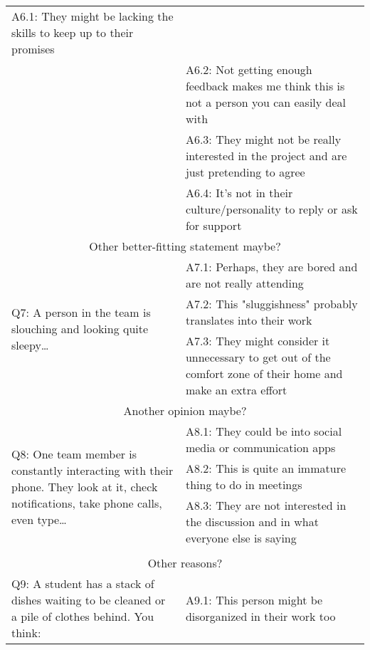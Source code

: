 \begin{longtable}{|  p{}  |  p{} |}
   	\hspace{0.3cm} A6.1: They might be lacking the skills to keep up to their promises \\
   	& \hspace{0.3cm} A6.2: Not getting enough feedback makes me think this is not a person you can easily deal with \\
   	& \hspace{0.3cm} A6.3: They might not be really interested in the project and are just pretending to agree \\
   & \hspace{0.3cm} A6.4: It’s not in their culture/personality to reply or ask for support \\
\hline
\multicolumn{2}{|c|}{Other better-fitting statement maybe?} \\
\hline
\multirow{3}{6cm}{Q7: A person in the team is slouching and looking quite sleepy…}
 & 
    \hspace{0.3cm} A7.1: Perhaps, they are bored and are not really attending \\
   &  \hspace{0.3cm} A7.2: This "sluggishness" probably translates into their work \\
    & \hspace{0.3cm} A7.3: They might consider it unnecessary to get out of the comfort zone of their home and make an extra effort \\
\hline
\multicolumn{2}{|c|}{Another opinion maybe?} \\
\hline
\multirow{4}{6cm}{Q8: One team member is constantly interacting with their phone. They look at it, check notifications, take phone calls, even type…}
 & 
    \hspace{0.3cm} A8.1: They could be into social media or communication apps \\
    & \hspace{0.3cm} A8.2: This is quite an immature thing to do in meetings \\
    & \hspace{0.3cm} A8.3: They are not interested in the discussion and in what everyone else is saying  \\
    &  \\
\hline
\multicolumn{2}{|c|}{Other reasons?} \\
\hline
\multirow{2}{6cm}{Q9: A student has a stack of dishes waiting to be cleaned or a pile of clothes behind. You think:} &
   \hspace{0.3cm} A9.1: This person might be disorganized in their work too \\

\end{longtable}
